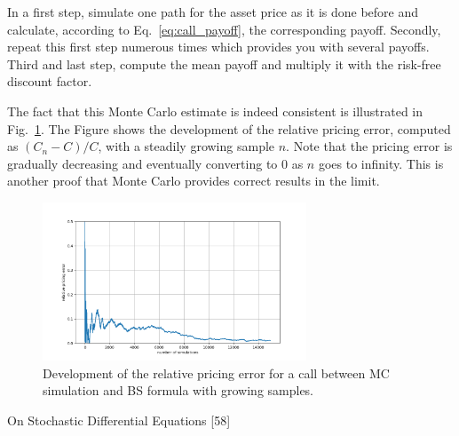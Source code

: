 In a first step, simulate one path for the asset price as it is done 
before and calculate, according to Eq.~\ref{eq:call_payoff}, the corresponding payoff. 
Secondly, repeat this first step numerous times which provides you with several
payoffs. Third and last step, compute the mean payoff and multiply it
with the risk-free discount factor. 

The fact that this Monte Carlo estimate is indeed consistent is illustrated 
in Fig.~\ref{fig:error_BS}. The Figure shows the development of the relative pricing error, 
computed as $(C_n − C)/C$, with a steadily growing sample $n$.
Note that the pricing error is gradually
decreasing and eventually converting to 0 as $n$ goes to infinity. This is
another proof that Monte Carlo provides correct results in the limit.

\begin{figure}[htb]
	\centering
	\includegraphics[width=0.7\textwidth]{figures/call_pricing_error.png}
	\caption{Development of the relative pricing error for a call between MC simulation and BS formula with growing samples.}
	\label{fig:error_BS}
\end{figure}

\begin{thebibliography}{9}
	On Stochastic Differential Equations {[}58{]}
\end{thebibliography}









